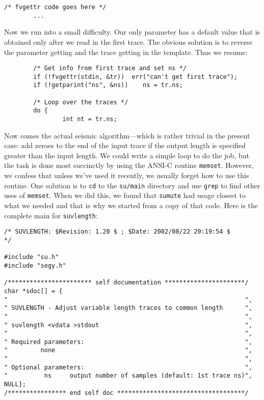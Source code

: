 {{{{{{{{\begin{verbatim}
/* fvgettr code goes here */
        ...

\end{verbatim}}\noindent
Now we run into a small difficulty.  Our only parameter has a default
value that is obtained only after we read in the first trace.  The
obvious solution is to reverse the parameter getting and the trace
getting in the template.  Thus we resume:
{\small\begin{verbatim}
        /* Get info from first trace and set ns */ 
        if (!fvgettr(stdin, &tr))  err("can't get first trace"); 
        if (!getparint("ns", &ns))    ns = tr.ns;

        /* Loop over the traces */
        do {
                int nt = tr.ns;
\end{verbatim}}\noindent
Now comes the actual seismic algorithm---which is rather trivial in
the present case:  add zeroes to the end of the input trace if the
output length is specified greater than the input length.  We could
write a simple loop to do the job, but the task is done most
succinctly by using the {\sf ANSI-C} routine {\tt memset}.  However, we
confess that unless we've used it recently, we usually forget how to
use this routine.  One solution is to {\tt cd} to the {\tt su/main}
directory and use {\tt grep} to find other uses of {\tt memset}.  When
we did this, we found that {\tt sumute} had usage closest to what we
needed and that is why we started from a copy of that code.  Here is
the complete main for {\tt suvlength}:
{\small\begin{verbatim}
/* SUVLENGTH: $Revision: 1.20 $ ; $Date: 2002/08/22 20:19:54 $        */

#include "su.h"
#include "segy.h"

/*********************** self documentation **********************/
char *sdoc[] = {
"                                                                 ",
" SUVLENGTH - Adjust variable length traces to common length      ",
"                                                                 ",
" suvlength <vdata >stdout                                        ",
"                                                                 ",
" Required parameters:                                            ",
"         none                                                    ",
"                                                                 ",
" Optional parameters:                                            ",
"          ns     output number of samples (default: 1st trace ns)",
NULL};
/**************** end self doc ***********************************/


\end{verbatim}}}}}}}}}
